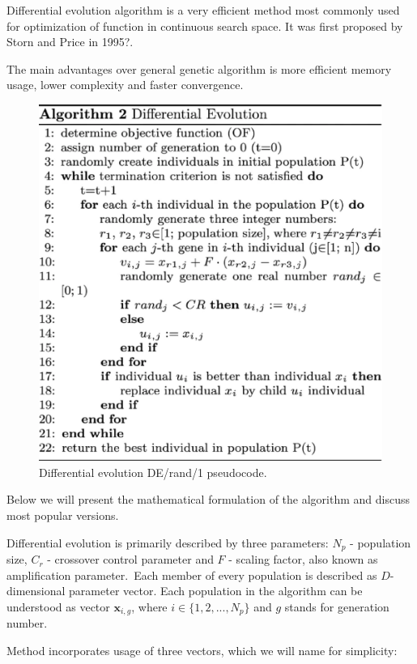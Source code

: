 \documentclass[12pt,a4paper,openany]{book}
\begin{document}
Differential evolution algorithm is a very efficient method most commonly used for optimization of function in continuous search space. It was first proposed by Storn and Price in 1995?. 

The main advantages over general genetic algorithm is more efficient memory usage, lower complexity and faster convergence.

 \begin{figure}[ht!]
     \centering
     \includegraphics[scale=0.5]{figs/diff-evo.eps}
     \caption{Differential evolution DE/rand/1 pseudocode.}\label{Fig:PROGAN}
 \end{figure}

Below we will present the mathematical formulation of the algorithm and discuss most popular versions.

Differential evolution is primarily described by three parameters: $N_{p}$ - population size, $C_{r}$ - crossover control parameter and $F$ - scaling factor, also known as amplification parameter.\
Each member of every population is described as $D$-dimensional parameter vector. Each population in the algorithm can be understood as vector $\textbf{x}_{i, g}$, where $i \in \{1, 2, ..., N_{p}\}$ and $g$ stands for generation number.

\noindent Method incorporates usage of three vectors, which we will name for simplicity:
\end{document}
